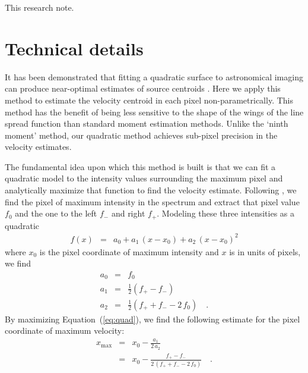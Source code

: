 \documentclass[rnaas]{aastex62}
\newcommand{\figurelabel}[1]{\label{fig:#1}}
\renewcommand{\eqref}[1]{\ref{eq:#1}}
\newcommand{\Eq}[1]{Equation~(\eqref{#1})}
\newcommand{\eq}[1]{\Eq{#1}}
\newcommand{\eqlabel}[1]{\label{eq:#1}}
\newcommand{\bvec}[1]{{\ensuremath{\boldsymbol{#1}}}}
\begin{document}
This research note. \citep{Perez:2018}

\section{Technical details}

It has been demonstrated that fitting a quadratic surface to astronomical
imaging can produce near-optimal estimates of source centroids
\citep{Vakili:2016}.
Here we apply this method to estimate the velocity centroid in each pixel
non-parametrically.
This method has the benefit of being less sensitive to the shape of the wings
of the line spread function than standard moment estimation methods.
Unlike the `ninth moment' method, our quadratic method achieves sub-pixel
precision in the velocity estimates.

The fundamental idea upon which this method is built is that we can fit a
quadratic model to the intensity values surrounding the maximum pixel and
analytically maximize that function to find the velocity estimate.
Following \citet{Vakili:2016}, we find the pixel of maximum intensity in the
spectrum and extract that pixel value $f_0$ and the one to the left $f_-$ and
right $f_+$.
Modeling these three intensities as a quadratic
\begin{eqnarray}
f(x) &=& a_0 + a_1\,(x-x_0) + a_2\,{(x-x_0)}^2
\eqlabel{quad}
\end{eqnarray}
where $x_0$ is the pixel coordinate of maximum intensity and $x$ is in units
of pixels, we find
\begin{eqnarray}
a_0 &=& f_0 \\
a_1 &=& \frac{1}{2}(f_+ - f_-) \\
a_2 &=& \frac{1}{2}(f_+ + f_- - 2\,f_0) \quad.
\end{eqnarray}
By maximizing \Eq{quad}, we find the following estimate for the pixel
coordinate of maximum velocity:
\begin{eqnarray}
x_\mathrm{max} &=& x_0 - \frac{a_1}{2\,a_2} \\
    &=& x_0 - \frac{f_+ - f_-}{2\,(f_+ + f_- - 2\,f_0)} \quad.
\end{eqnarray}



\end{document}
